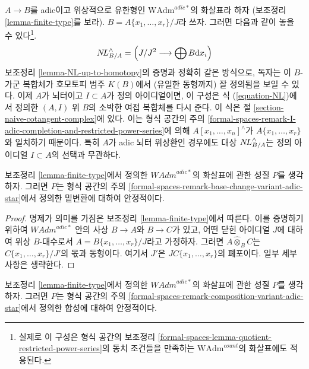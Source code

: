 \begin{remark}
\label{remark-NL-well-defined-topological}
$A \to B$를 adic이고 위상적으로 유한형인
$\text{WAdm}^{adic*}$의 화살표라 하자
(보조정리 \ref{lemma-finite-type}를 보라).
$B = A\{x_1, \ldots, x_r\}/J$라 쓰자. 그러면 다음과 같이 놓을 수 있다\footnote{실제로 이 구성은 형식 공간의 보조정리
\ref{formal-spaces-lemma-quotient-restricted-power-series}의
동치 조건들을 만족하는 $\text{WAdm}^{count}$의 화살표에도 적용된다.}.
$$
\mathop{N\!L}\nolimits_{B/A}^\wedge = \left(J/J^2 \longrightarrow \bigoplus B\text{d}x_i\right)
$$
보조정리 \ref{lemma-NL-up-to-homotopy}의 증명과 정확히 같은 방식으로,
독자는 이 $B$-가군 복합체가 호모토피 범주 $K(B)$에서
(유일한 동형까지) 잘 정의됨을 보일 수 있다.
이제 $A$가 뇌터이고 $I \subset A$가 정의 아이디얼이면,
이 구성은 식 (\ref{equation-NL})에서 정의한
$(A, I)$ 위 $B$의 소박한 여접 복합체를 다시 준다.
이 식은 절 \ref{section-naive-cotangent-complex}에 있다.
이는 형식 공간의 주의
\ref{formal-spaces-remark-I-adic-completion-and-restricted-power-series}에 의해
$A[x_1, \ldots, x_n]^\wedge$가 $A\{x_1, \ldots, x_r\}$와 일치하기 때문이다.
특히 $A$가 adic 뇌터 위상환인 경우에도 대상
$\mathop{N\!L}\nolimits_{B/A}^\wedge$는 정의 아이디얼 $I \subset A$의 선택과 무관하다.
\end{remark}

\begin{lemma}
\label{lemma-base-change-finite-type}
보조정리 \ref{lemma-finite-type}에서 정의한
$\textit{WAdm}^{adic*}$의 화살표에 관한 성질 $P$를 생각하자.
그러면 $P$는 형식 공간의 주의
\ref{formal-spaces-remark-base-change-variant-adic-star}에서 정의한
밑변환에 대하여 안정적이다.
\end{lemma}

\begin{proof}
명제가 의미를 가짐은 보조정리 \ref{lemma-finite-type}에서 따른다.
이를 증명하기 위하여 $\textit{WAdm}^{adic*}$ 안의 사상
$B \to A$와 $B \to C$가 있고, 어떤 닫힌 아이디얼 $J$에 대하여
위상 $B$-대수로서 $A = B\{x_1, \ldots, x_r\}/J$라고 가정하자.
그러면 $A \widehat{\otimes}_B C$는
$C\{x_1, \ldots, x_r\}/J'$의 몫과 동형이다. 여기서 $J'$은
$JC\{x_1, \ldots, x_r\}$의 폐포이다. 일부 세부 사항은 생략한다.
\end{proof}

\begin{lemma}
\label{lemma-composition-finite-type}
보조정리 \ref{lemma-finite-type}에서 정의한
$\textit{WAdm}^{adic*}$의 화살표에 관한 성질 $P$를 생각하자.
그러면 $P$는 형식 공간의 주의
\ref{formal-spaces-remark-composition-variant-adic-star}에서 정의한
합성에 대하여 안정적이다.
\end{lemma}


